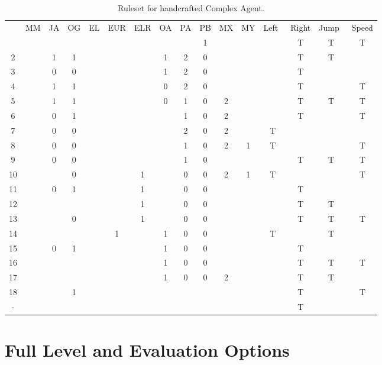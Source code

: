 \begin{appendices}
\begin{table}[!h]
\begin{adjustwidth}{-2cm}{-2cm}
\begin{center}
\begin{tabular}{ | c | c | c | c | c | c | c | c | c | c | c | c || c | c | c | c |}
	& \tiny MM & \tiny JA & \tiny OG & \tiny EL & \tiny EUR & \tiny ELR & \tiny OA & \tiny PA & \tiny PB & \tiny MX & \tiny MY & \tiny Left~ & \tiny Right & \tiny Jump~ & \tiny Speed \TBstrut \\ \thickhline
	1 & & & & & & & & & 1 & & 		& & T & T & T \\ \hline
	2 & & 1 & 1 & & & & 1 & 2 & 0 & & 		& & T & T & \\ \hline
	3 & & 0 & 0 & & & & 1 & 2 & 0 & & 		& & T & & \\ \hline
	4 & & 1 & 1 & & & & 0 & 2 & 0 & & 		& & T & & T \\ \hline
	5 & & 1 & 1 & & & & 0 & 1 & 0 & 2 & 		& & T & T & T \\ \hline
	6 & & 0 & 1 & & & & & 1 & 0 & 2 & 		& & T & & T \\ \hline
	7 & & 0 & 0 & & & & & 2 & 0 & 2 & 		& T & & & \\ \hline
	8 & & 0 & 0 & & & & & 1 & 0 & 2 & 1 		& T & & & T \\ \hline
	9 & & 0 & 0 & & & & & 1 & 0 & & 		& & T & T & T \\ \hline
	10 & & & 0 & & & 1 & & 0 & 0 & 2 & 1 		& T & & & T \\ \hline
	11 & & 0 & 1 & & & 1 & & 0 & 0 & & 		& & T & & \\ \hline
	12 & & & & & & 1 & & 0 & 0 & & 		& & T & T & \\ \hline
	13 & & & 0 & & & 1 & & 0 & 0 & & 		& & T & T & T \\ \hline
	14 & & & & & 1 & & 1 & 0 & 0 & & 		& T & & T & \\ \hline
	15 & & 0 & 1 & & & & 1 & 0 & 0 & & 		& & T & & \\ \hline
	16 & & & & & & & 1 & 0 & 0 & & 		& & T & T & T \\ \hline
	17 & & & & & & & 1 & 0 & 0 & 2 & 		& & T & T & \\ \hline
	18 & & & 1 & & & & & & & & 		& & T & & T \\ \hline
	
	-  & & & & & & & & & & & 		& & T & & \\ \hline
    \end{tabular}
  \end{center}
  \end{adjustwidth}
  \caption{Ruleset for handcrafted Complex Agent.}
  \label{tab:CA}
\end{table}

\section{Full Level and Evaluation Options}
\label{app:loem}


\end{appendices}
